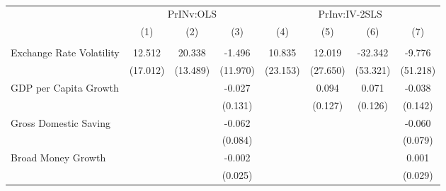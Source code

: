 \begin{table}[H] \def\sym#1{\ifmmode^{#1}\else\(^{#1}\)\fi} \caption{} \begin{adjustbox}{max width=\textwidth} \begin{tabular}{l*{7}{c}} \\ \hline\hline
            &\multicolumn{3}{c}{PrINv:OLS}                                    &\multicolumn{4}{c}{PrInv:IV-2SLS}                                                      \\\cmidrule(lr){2-4}\cmidrule(lr){5-8}
            &\multicolumn{1}{c}{(1)}         &\multicolumn{1}{c}{(2)}         &\multicolumn{1}{c}{(3)}         &\multicolumn{1}{c}{(4)}         &\multicolumn{1}{c}{(5)}         &\multicolumn{1}{c}{(6)}         &\multicolumn{1}{c}{(7)}         \\
\hline \addlinespace \multicolumn{7}{l}{} \\  \addlinespace[2pt]
Exchange Rate Volatility&      12.512         &      20.338         &      -1.496         &      10.835         &      12.019         &     -32.342         &      -9.776         \\
            &    (17.012)         &    (13.489)         &    (11.970)         &    (23.153)         &    (27.650)         &    (53.321)         &    (51.218)         \\
\addlinespace
GDP per Capita Growth&                     &                     &      -0.027         &                     &       0.094         &       0.071         &      -0.038         \\
            &                     &                     &     (0.131)         &                     &     (0.127)         &     (0.126)         &     (0.142)         \\
\addlinespace
Gross Domestic Saving&                     &                     &      -0.062         &                     &                     &                     &      -0.060         \\
            &                     &                     &     (0.084)         &                     &                     &                     &     (0.079)         \\
\addlinespace
Broad Money Growth&                     &                     &      -0.002         &                     &                     &                     &       0.001         \\
            &                     &                     &     (0.025)         &                     &                     &                     &     (0.029)         \\

\end{tabular}
\end{adjustbox}
\end{table}
